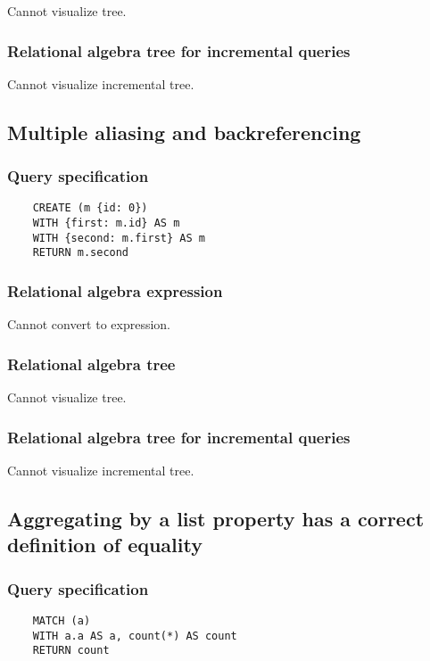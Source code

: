 	Cannot visualize tree.

	\subsubsection*{Relational algebra tree for incremental queries}

	Cannot visualize incremental tree.
	\subsection{Multiple aliasing and backreferencing}

	\subsubsection*{Query specification}

	\begin{lstlisting}
	CREATE (m {id: 0})
	WITH {first: m.id} AS m
	WITH {second: m.first} AS m
	RETURN m.second
	\end{lstlisting}


	\subsubsection*{Relational algebra expression}

	Cannot convert to expression.

	\subsubsection*{Relational algebra tree}

	Cannot visualize tree.

	\subsubsection*{Relational algebra tree for incremental queries}

	Cannot visualize incremental tree.
	\subsection{Aggregating by a list property has a correct definition of equality}

	\subsubsection*{Query specification}

	\begin{lstlisting}
	MATCH (a)
	WITH a.a AS a, count(*) AS count
	RETURN count
	\end{lstlisting}



